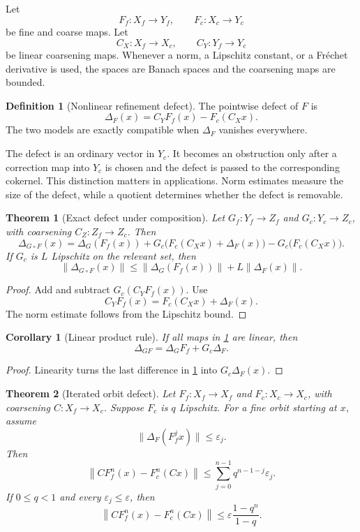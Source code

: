 \documentclass[11pt,a4paper]{article}
\newtheorem{theorem}{Theorem}[section]
\theoremstyle{plain}
\newtheorem{corollary}[corollary]{Corollary}
\theoremstyle{definition}
\newtheorem{definition}[definition]{Definition}
\theoremstyle{remark}
\begin{document}
Let
\[
F_f:X_f\longrightarrow Y_f,
\qquad
F_c:X_c\longrightarrow Y_c
\]
be fine and coarse maps.  Let
\[
C_X:X_f\longrightarrow X_c,
\qquad
C_Y:Y_f\longrightarrow Y_c
\]
be linear coarsening maps.  Whenever a norm, a Lipschitz constant, or a Fr\'echet derivative is used, the spaces are Banach spaces and the coarsening maps are bounded.

\begin{definition}[Nonlinear refinement defect]\label{def:nonlinear_defect}
The pointwise defect of $F$ is
\[
\Delta_F(x)
=
C_YF_f(x)-F_c(C_Xx).
\]
The two models are exactly compatible when $\Delta_F$ vanishes everywhere.
\end{definition}


The defect is an ordinary vector in $Y_c$.  It becomes an obstruction only after a correction map into $Y_c$ is chosen and the defect is passed to the corresponding cokernel.  This distinction matters in applications.  Norm estimates measure the size of the defect, while a quotient determines whether the defect is removable.

\begin{theorem}[Exact defect under composition]\label{thm:defect_composition_identity}
Let $G_f:Y_f\to Z_f$ and $G_c:Y_c\to Z_c$, with coarsening $C_Z:Z_f\to Z_c$.  Then
\[
\Delta_{G\circ F}(x)
=
\Delta_G(F_f(x))
+
G_c\big(F_c(C_Xx)+\Delta_F(x)\big)
-
G_c\big(F_c(C_Xx)\big).
\]
If $G_c$ is $L$ Lipschitz on the relevant set, then
\[
\|\Delta_{G\circ F}(x)\|
\le
\|\Delta_G(F_f(x))\|
+
L\|\Delta_F(x)\|.
\]
\end{theorem}

\begin{proof}
Add and subtract $G_c(C_YF_f(x))$.  Use
\[
C_YF_f(x)=F_c(C_Xx)+\Delta_F(x).
\]
The norm estimate follows from the Lipschitz bound.
\end{proof}

\begin{corollary}[Linear product rule]\label{cor:linear_defect_product}
If all maps in \cref{thm:defect_composition_identity} are linear, then
\[
\Delta_{GF}
=
\Delta_G F_f+G_c\Delta_F.
\]
\end{corollary}

\begin{proof}
Linearity turns the last difference in \cref{thm:defect_composition_identity} into $G_c\Delta_F(x)$.
\end{proof}

\begin{theorem}[Iterated orbit defect]\label{thm:iterated_orbit_defect}
Let $F_f:X_f\to X_f$ and $F_c:X_c\to X_c$, with coarsening $C:X_f\to X_c$.  Suppose $F_c$ is $q$ Lipschitz.  For a fine orbit starting at $x$, assume
\[
\|\Delta_F(F_f^j x)\|\le\varepsilon_j.
\]
Then
\[
\left\|CF_f^n(x)-F_c^n(Cx)\right\|
\le
\sum_{j=0}^{n-1}q^{n-1-j}\varepsilon_j.
\]
If $0\le q<1$ and every $\varepsilon_j\le\varepsilon$, then
\[
\left\|CF_f^n(x)-F_c^n(Cx)\right\|
\le
\varepsilon\frac{1-q^n}{1-q}.
\]
\end{theorem}
\end{document}
